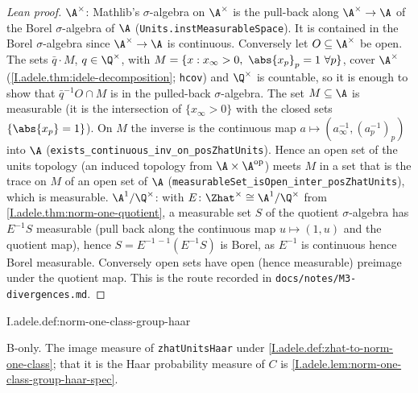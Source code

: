 \begin{proof}[Lean proof]
\emph{$\A^\times$}: Mathlib's $\sigma$-algebra on $\A^\times$ is the pull-back along $\A^\times\to\A$ of the Borel $\sigma$-algebra of $\A$ (\texttt{Units.instMeasurableSpace}). It is contained in the Borel $\sigma$-algebra since $\A^\times\to\A$ is continuous. Conversely let $O\subseteq\A^\times$ be open. The sets $\bar q\cdot M$, $q\in\Q^\times$, with $M=\{x:x_\infty>0,\ \abs{x_p}_p=1\ \forall p\}$, cover $\A^\times$ (\cref{I.adele.thm:idele-decomposition}; \texttt{hcov}) and $\Q^\times$ is countable, so it is enough to show that $\bar q^{-1}O\cap M$ is in the pulled-back $\sigma$-algebra. The set $M\subseteq\A$ is measurable (it is the intersection of $\{x_\infty>0\}$ with the closed sets $\{\abs{x_p}=1\}$). On $M$ the inverse is the continuous map $a\mapsto(a_\infty^{-1},(a_p^{-1})_p)$ into $\A$ (\texttt{exists\_continuous\_inv\_on\_posZhatUnits}). Hence an open set of the units topology (an induced topology from $\A\times\A^{\mathrm{op}}$) meets $M$ in a set that is the trace on $M$ of an open set of $\A$ (\texttt{measurableSet\_isOpen\_inter\_posZhatUnits}), which is measurable. \emph{$\A^1/\Q^\times$}: with $E\colon\Zhat^\times\cong\A^1/\Q^\times$ from \cref{I.adele.thm:norm-one-quotient}, a measurable set $S$ of the quotient $\sigma$-algebra has $E^{-1}S$ measurable (pull back along the continuous map $u\mapsto(1,u)$ and the quotient map), hence $S=E^{-1\,-1}(E^{-1}S)$ is Borel, as $E^{-1}$ is continuous hence Borel measurable. Conversely open sets have open (hence measurable) preimage under the quotient map. This is the route recorded in \texttt{docs/notes/M3-divergences.md}.
\end{proof}

\begin{definition}
\bonly
{}
\end{definition}
\begin{tfformal}{I.adele.def:norm-one-class-group-haar}
\begin{tffidelity}
B-only. The image measure of \texttt{zhatUnitsHaar} under \cref{I.adele.def:zhat-to-norm-one-class}; that it is the Haar probability measure of $C$ is \cref{I.adele.lem:norm-one-class-group-haar-spec}.
\end{tffidelity}
\end{tfformal}

